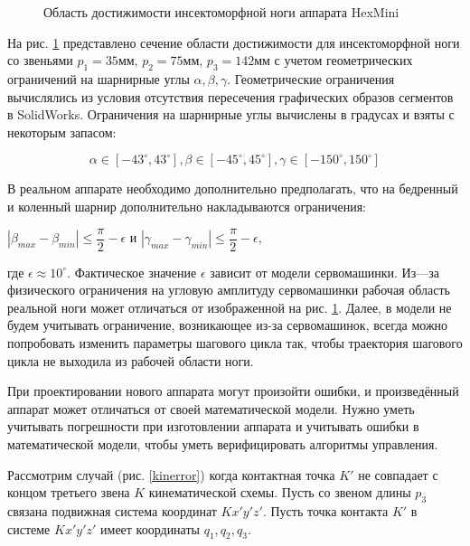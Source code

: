 \begin{figure}
\caption{Область достижимости инсектоморфной ноги аппарата HexMini}
\label{fig:leg_area}
\end{figure}


На рис. \ref{fig:leg_area} представлено сечение области достижимости для инсектоморфной ноги со звеньями $p_1 = 35$мм, $p_2=75$мм, $p_3=142$мм с учетом геометрических ограничений на шарнирные углы $\alpha, \beta, \gamma$. Геометрические ограничения вычислялись из условия отсутствия пересечения графических образов сегментов в SolidWorks. Ограничения на шарнирные углы вычислены в градусах и взяты с некоторым запасом:

\begin{equation}
\alpha \in [-43^{\circ},43^{\circ}], \beta\in [-45^{\circ},45^{\circ}], \gamma \in [-150^{\circ},150^{\circ}]
\end{equation}

В реальном аппарате необходимо дополнительно предполагать, что на бедренный и коленный шарнир дополнительно накладываются ограничения:
\begin{center}
$|\beta_{max}-\beta_{min}| \leq \dfrac{\pi}{2}-\epsilon$ и $|\gamma_{max}-\gamma_{min}| \leq \dfrac{\pi}{2}-\epsilon$,
\end{center}  
где $\epsilon \approx 10^{\circ}$. Фактическое значение $\epsilon$ зависит от модели сервомашинки.  Из---за физического ограничения на угловую амплитуду сервомашинки рабочая область реальной ноги может отличаться от изображенной на рис. \ref{fig:leg_area}. Далее, в модели не будем учитывать ограничение, возникающее из-за сервомашинок, всегда можно попробовать изменить параметры шагового цикла так, чтобы траектория шагового цикла не выходила из рабочей области ноги.


При проектировании нового аппарата могут произойти ошибки, и произведённый аппарат может отличаться от своей математической модели. Нужно уметь учитывать погрешности при изготовлении аппарата и учитывать ошибки в математической модели, чтобы уметь верифицировать алгоритмы управления.

Рассмотрим случай (рис. \ref{kinerror}) когда контактная точка $K'$ не совпадает с концом третьего звена $K$ кинематической схемы. Пусть со звеном длины $p_3$ связана подвижная система координат $Kx'y'z'$. Пусть точка контакта $K'$ в системе $Kx'y'z'$ имеет координаты ${q_1,q_2,q_3}$. 

